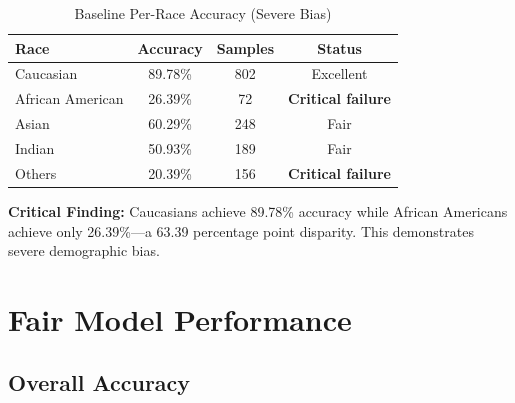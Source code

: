 \documentclass[11pt,a4paper,oneside]{report}
\begin{document}
\begin{table}[h]

\centering

\caption{Baseline Per-Race Accuracy (Severe Bias)}

\begin{tabular}{|l|c|c|c|}

\hline

\textbf{Race} & \textbf{Accuracy} & \textbf{Samples} & \textbf{Status} \\

\hline

Caucasian & 89.78\% & 802 & Excellent \\

\hline

African American & 26.39\% & 72 & \textbf{Critical failure} \\

\hline

Asian & 60.29\% & 248 & Fair \\

\hline

Indian & 50.93\% & 189 & Fair \\

\hline

Others & 20.39\% & 156 & \textbf{Critical failure} \\

\hline

\end{tabular}

\end{table}

\textbf{Critical Finding:} Caucasians achieve 89.78\% accuracy while African Americans achieve only 26.39\%---a 63.39 percentage point disparity. This demonstrates severe demographic bias.

\section{Fair Model Performance}

\subsection{Overall Accuracy}
\end{document}
